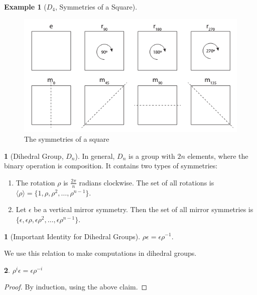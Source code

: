 \documentclass[12pt]{article}
\theoremstyle{definition}
\newtheorem{definition}{\color{NavyBlue}{\textbf{Definition}}}
\newtheorem{theorem}{\color{ForestGreen}{\textbf{Theorem}}}
\newcommand{\e}{\epsilon}
\newtheorem{example}{\color{WildStrawberry}Example}
\theoremstyle{definition}
\begin{document}
\begin{example}[$D_4$, Symmetries of a Square]
\begin{figure}[H]
	\begin{center}
		\includegraphics[scale=.75]{square-symmetries}
	\end{center}
	\caption{The symmetries of a square}
	\label{triangle_sym}
\end{figure}

\end{example}

\begin{definition}[Dihedral Group, $D_n$]
In general, $D_n$ is a group with $2n$ elements, where the binary operation is composition. It contains two types of symmetries:
\begin{enumerate}
	\item The rotation $\rho$ is $\frac{2\pi}{n}$ radians clockwise. The set of all rotations is $\langle \rho \rangle = \{1, \rho, \rho^2, \ldots, \rho^{n-1} \}$. 
	\item Let $\e$ be a vertical mirror symmetry. Then the set of all mirror symmetries is $\{\e, \e\rho, \e\rho^2, \ldots, \e \rho^{n-1} \}$. 
\end{enumerate}
\end{definition}


\begin{theorem}[Important Identity for Dihedral Groups]
$\rho \e = \e \rho^{-1}$. 
\end{theorem}
We use this relation to make computations in dihedral groups. 


\begin{theorem}
$\rho^i \e = \e \rho^{-i}$
\end{theorem}
\begin{proof}
By induction, using the above claim. 
\end{proof}
\end{document}
